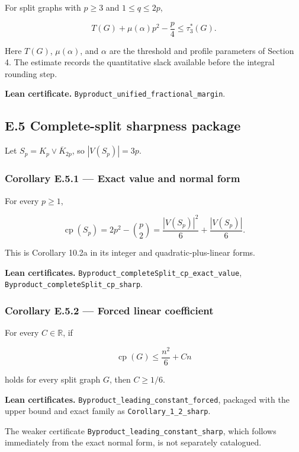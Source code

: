 \documentclass[
  american,
  11pt,
  a4paper,
]{article}
\begin{document}
For split graphs with \(p\ge3\) and \(1\le q\le2p\),

\[
T(G)+\mu(\alpha)p^2-\frac p4
\le
\tau_3^*(G).
\]

Here \(T(G)\), \(\mu(\alpha)\), and \(\alpha\) are the threshold and profile parameters of Section 4. The estimate records the quantitative slack available before the integral rounding step.

\textbf{Lean certificate.} \texttt{Byproduct\_unified\_fractional\_margin}.

\subsection{E.5 Complete-split sharpness package}\label{e.5-complete-split-sharpness-package}

Let \(S_p=K_p\vee\overline K_{2p}\), so \(|V(S_p)|=3p\).

\subsubsection{Corollary E.5.1 --- Exact value and normal form}\label{corollary-e.5.1-exact-value-and-normal-form}

For every \(p\ge1\),

\[
\operatorname{cp}(S_p)
=2p^2-\binom p2
=\frac{|V(S_p)|^2}{6}+\frac{|V(S_p)|}{6}.
\]

This is Corollary 10.2a in its integer and quadratic-plus-linear forms.

\textbf{Lean certificates.} \texttt{Byproduct\_completeSplit\_cp\_exact\_value}, \texttt{Byproduct\_completeSplit\_cp\_sharp}.

\subsubsection{Corollary E.5.2 --- Forced linear coefficient}\label{corollary-e.5.2-forced-linear-coefficient}

For every \(C\in\mathbb R\), if

\[
\operatorname{cp}(G)\le \frac{n^2}{6}+Cn
\]

holds for every split graph \(G\), then \(C\ge1/6\).

\textbf{Lean certificates.} \texttt{Byproduct\_leading\_constant\_forced}, packaged with the upper bound and exact family as \texttt{Corollary\_1\_2\_sharp}.

The weaker certificate \texttt{Byproduct\_leading\_constant\_sharp}, which follows immediately from the exact normal form, is not separately catalogued.
\end{document}
